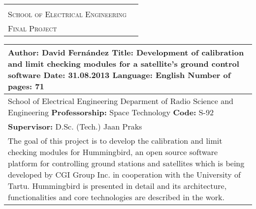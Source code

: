 \thispagestyle{empty}
\begin{tabular}{l r}
\begin{minipage}[c]{102mm} 
\textsc{Aalto University}\\ \textsc{School of Electrical Engineering}
\end{minipage}
 & \hfill
\begin{minipage}[c]{40mm} 
\begin{flushright}
\textsc{Abstract of the}\\ \textsc{Final Project}
\end{flushright}
\end{minipage}\\ 
\end{tabular}

\begin{tabular}{|l|}
\hline %
\begin{minipage}[c][26mm]{\textwidth} 
\vfill
\textbf{Author:} David Fernández \vfill
\textbf{Title:} Development of calibration and limit checking modules for a satellite's ground control software \vfill
\textbf{Date:} 31.08.2013 \hfill \textbf{Language:} English \hfill \textbf{Number of pages:} 71 \vfill
\vfill
\end{minipage}\\ 
\hline

\begin{minipage}[c][18mm]{\textwidth} 
\vfill
School of Electrical Engineering \vfill
Deparment of Radio Science and Engineering \vfill
\textbf{Professorship:} Space Technology \hfill \textbf{Code:} S-92\vfill
\vfill
\end{minipage}\\
\hline

\begin{minipage}[c][12mm]{\textwidth} 
\vfill
\textbf{Supervisor:} D.Sc. (Tech.) Jaan Praks \vfill
\vfill
\end{minipage}\\
\hline
\begin{minipage}[t][133mm]{\textwidth} %
The goal of this project is to develop the calibration and limit checking modules for Hummingbird, an open source software platform for controlling ground stations and satellites which is being developed by CGI Group Inc. in cooperation with the University of Tartu. Hummingbird is presented in detail and its architecture, functionalities and core technologies are described in the work.

 



\end{minipage}
\end{tabular}
